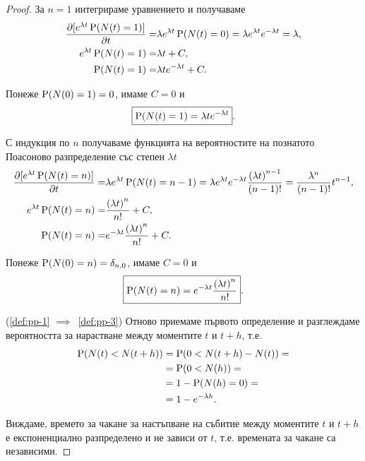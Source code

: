 \documentclass[numbers=endperiod, bibliography=totocnumbered]{scrartcl}
\begin{document}
\begin{proof}
  За \( n = 1 \) интегрираме уравнението и получаваме
  \begin{align*}
    \frac {\partial [e^{\lambda t} \operatorname{P}(N(t) = 1)]} {\partial t}
    =&
    \lambda e^{\lambda t} \operatorname{P}(N(t) = 0)
    =
    \lambda e^{\lambda t} e^{-\lambda t}
    =
    \lambda,
    \\
    e^{\lambda t} \operatorname{P}(N(t) = 1)
    =&
    \lambda t + C,
    \\
    \operatorname{P}(N(t) = 1)
    =&
    \lambda t e^{-\lambda t} + C.
  \end{align*}

  Понеже \( \operatorname{P}(N(0) = 1) = 0 \), имаме \( C = 0 \) и
  \begin{align*}
    \boxed{\operatorname{P}(N(t) = 1) = \lambda t e^{-\lambda t}}.
  \end{align*}

  С индукция по \( n \) получаваме функцията на вероятностите на познатото Поасоново разпределение със степен \( \lambda t \)
  \begin{align*}
    \frac {\partial [e^{\lambda t} \operatorname{P}(N(t) = n)]} {\partial t}
    =&
    \lambda e^{\lambda t} \operatorname{P}(N(t) = n - 1)
    =
    \lambda e^{\lambda t} e^{-\lambda t} \frac {{(\lambda t)}^{n-1}} {(n-1)!}
    =
    \frac {\lambda^n} {(n-1)!} t^{n-1},
    \\
    e^{\lambda t} \operatorname{P}(N(t) = n)
    =&
    \frac {{(\lambda t)}^n} {n!} + C,
    \\
    \operatorname{P}(N(t) = n)
    =&
    e^{-\lambda t} \frac {{(\lambda t)}^n} {n!} + C.
  \end{align*}

  Понеже \( \operatorname{P}(N(0) = n) = \delta_{n,0} \), имаме \( C = 0 \) и
  \begin{align*}
    \boxed{\operatorname{P}(N(t) = n) = e^{-\lambda t} \frac {{(\lambda t)}^n} {n!}}.
  \end{align*}

  (\ref{def:pp-1} \( \implies \)~\ref{def:pp-3}) Отново приемаме първото определение и разглеждаме вероятността за нарастване между моментите \( t \) и \( t+h \), т.е.
  \begin{align*}
    \operatorname{P}(N(t) < N(t+h))
    &=
    \operatorname{P}(0 < N(t+h) - N(t))
    = \\ &=
    \operatorname{P}(0 < N(h))
    = \\ &=
    1 - \operatorname{P}(N(h) = 0)
    = \\ &=
    1 - e^{-\lambda h}.
  \end{align*}

  Виждаме, времето за чакане за настъпване на събитие между моментите \( t \) и \( t+h \) е експоненциално разпределено и не зависи от \( t \), т.е. времената за чакане са независими.


\end{proof}
\end{document}
